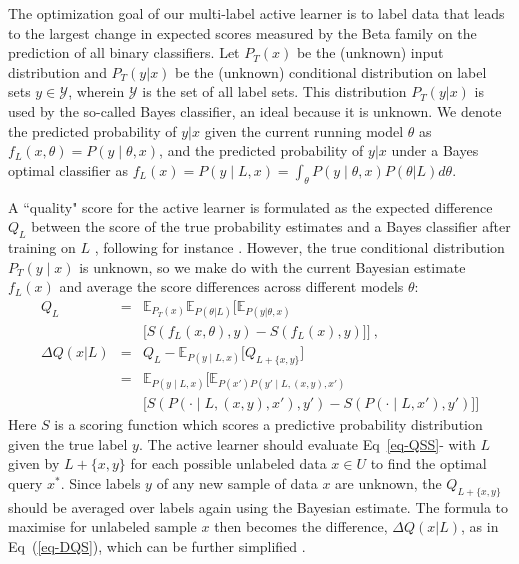 \documentclass[letterpaper]{article} %
\begin{document}
The optimization goal of our multi-label active learner is to
label data that
leads to the largest change in expected scores
measured by the Beta family on the prediction of all binary classifiers. 
Let $P_T(x)$ be the (unknown) input distribution and
$P_T(y|x)$ be the (unknown) conditional distribution on label sets
$y\in \mathcal{Y}$, wherein $\mathcal{Y}$ is the set of all label sets.
This distribution $P_T(y|x)$ is used by the so-called Bayes classifier, an ideal because it is unknown.
We denote the predicted probability of $y|x$ given the current running model $\theta$ as $f_L(x,\theta)=P(y \mid \theta,x)$, 
and 
the predicted probability of $y|x$ under a Bayes optimal classifier
as $f_{L}(x)=P(y\mid L,x)=\int_\theta P(y \mid \theta,x) P(\theta|L) d\theta$. 

A ``quality"  score for the active learner is formulated
as the expected difference $Q_L$ 
between the score of the true probability estimates and a Bayes classifier after training on $L$ \citep{TanDuBun-IEEEPAMI23}, following for instance \citet[Sct.~4.1]{pmlr-v20-hung11}.
However, the  true conditional distribution $P_T(y\mid x)$ is unknown, so we make do with the current Bayesian estimate $f_L(x)$ and average the score differences across different models $\theta$:
{\scriptsize
\begin{eqnarray}
    Q_L 
    &=&  \mathbb{E}_{P_T(x)} 
    \mathbb{E}_{P(\theta|L)}  \Big[
    \mathbb{E}_{P(y|\theta,x)}  \nonumber\\
    && \big[
            S(f_L(x,\theta),y) - S(f_L(x),y)  
        \big] \Big] ~, \label{eq-QSS}\\
        \Delta{Q}(x|L)
        &=& Q_{L} - \mathbb{E}_{ P(y \mid L,x) }\big[ Q_{L+\{x,y\}}   \big]
        \nonumber\\%
    &=&\mathbb{E}_{P(y\mid L, x)}
    \bigg[
        \mathbb{E}_{P(x') P (y' \mid L, (x, y), x')}
    \nonumber\\
    &&
        \big[
            S(P(\cdot \mid L, (x, y), x'), y')
           - S(P(\cdot \mid L, x'), y')
        \big]
    \bigg] \label{eq-DQS} 
\end{eqnarray}}
\noindent
Here $S$ is a scoring function which
scores a predictive probability distribution given the true label $y$. The active learner should evaluate Eq~\eqref{eq-QSS}- with $L$ given by ${L+ \{x,y\}}$ for each possible unlabeled data $x \in U$ to find the optimal query  $x^*$.
Since labels $y$ of any new sample of data $x$ are unknown,
the $Q_{L+ \{x,y\}}$ should be averaged over labels again using the Bayesian estimate.  The formula to maximise for unlabeled sample $x$ then becomes the difference, 
$\Delta{Q}(x|L)$, as in Eq~(\ref{eq-DQS}),
which can be further simplified \cite[Equation 6]{TanDuBun-IEEEPAMI23}.
\end{document}
